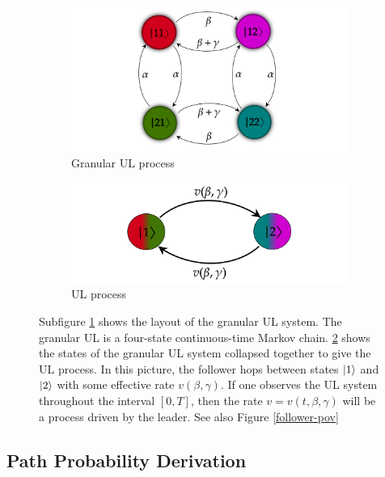 \begin{figure}
  \begin{subfigure}[b]{0.49\textwidth}
  \centering
  \includegraphics[width = \textwidth]{figures/UL_granular.png}
  \caption{Granular UL process}
  \label{granular_UL}
\end{subfigure}
\begin{subfigure}[b]{0.49\textwidth}
  \centering
  \includegraphics[width = \textwidth]{figures/UL.png}
  \caption{UL process}
  \label{coarse_grained_UL}
\end{subfigure}
\caption{\footnotesize Subfigure \ref{granular_UL} shows the layout of the granular UL system. The granular UL is a four-state continuous-time Markov chain. \ref{coarse_grained_UL} shows the states of the granular UL system collapsed together to give the UL process. In this picture, the follower hops between states $\ket{1}$ and $\ket{2}$ with some effective rate $v(\beta,\gamma)$. If one observes the UL system throughout the interval $[0,T]$, then the rate $v = v(t, \beta, \gamma)$ will be a process driven by the leader. See also Figure \ref{follower-pov}}
\label{system_desc_fig_UL}
\end{figure}


\subsection{Path Probability Derivation}

